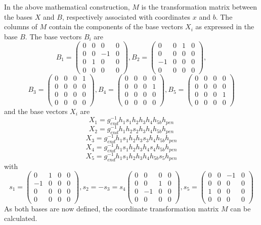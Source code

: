 \documentclass[a4paper,11pt,oneside,onecolumn]{article}
\begin{document}
In the above mathematical construction, $M$ is the transformation matrix between the bases $X$ and $B$, respectively associated with coordinates $x$ and $b$. The columns of $M$ contain the components of the base vectors $X_i$ as expressed in the base $B$. The base vectors $B_i$ are 
$$
B_1 = \left(
\begin{matrix}
0 & 0 & 0 & 0 \\
0 & 0 & -1 & 0 \\
0 & 1 & 0 & 0 \\
0 & 0 & 0 & 0
\end{matrix}
\right),
%
B_2 = \left(
\begin{matrix}
0 & 0 & 1 & 0 \\
0 & 0 & 0 & 0 \\
-1 & 0 & 0 & 0 \\
0 & 0 & 0 & 0
\end{matrix}
\right),
$$
$$
B_3 = \left(
\begin{matrix}
0 & 0 & 0 & 1 \\
0 & 0 & 0 & 0 \\
0 & 0 & 0 & 0 \\
0 & 0 & 0 & 0
\end{matrix}
\right),
B_4 = \left(
\begin{matrix}
0 & 0 & 0 & 0 \\
0 & 0 & 0 & 1 \\
0 & 0 & 0 & 0 \\
0 & 0 & 0 & 0
\end{matrix}
\right),
%
B_5 = \left(
\begin{matrix}
0 & 0 & 0 & 0 \\
0 & 0 & 0 & 0 \\
0 & 0 & 0 & 1 \\
0 & 0 & 0 & 0
\end{matrix}
\right)
$$
and the base vectors $X_i$ are
$$
X_1 = g_{end}^{-1}h_1s_1h_2h_3h_4h_{5b}h_{pen}
$$
$$
X_2 = g_{end}^{-1}h_1h_2s_2h_3h_4h_{5b}h_{pen}
$$
$$
X_3 = g_{end}^{-1}h_1s_1h_2h_3s_3h_4h_{5b}h_{pen}
$$
$$
X_4 = g_{end}^{-1}h_1s_1h_2h_3h_4s_4h_{5b}h_{pen}
$$
$$
X_5 = g_{end}^{-1}h_1s_1h_2h_3h_4h_{5b}s_5h_{pen}
$$
with
$$
s_1 = \left(
\begin{matrix}
0 & 1 & 0 & 0 \\
-1 & 0 & 0 & 0 \\
0 & 0 & 0 & 0 \\
0 & 0 & 0 & 0
\end{matrix}
\right),
%
s_2 = -s_3 = s_4\left(
\begin{matrix}
0 & 0 & 0 & 0 \\
0 & 0 & 1 & 0 \\
0 & -1 & 0 & 0 \\
0 & 0 & 0 & 0
\end{matrix}
\right),
%
s_5 = \left(
\begin{matrix}
0 & 0 & -1 & 0 \\
0 & 0 & 0 & 0 \\
1 & 0 & 0 & 0 \\
0 & 0 & 0 & 0
\end{matrix}
\right)
$$
As both bases are now defined, the coordinate transformation matrix $M$ can be calculated.
\end{document}

